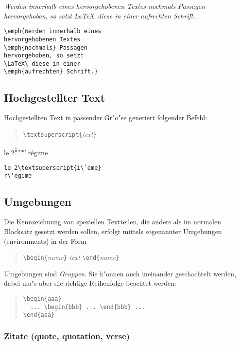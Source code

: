 \exa 
\emph{Werden innerhalb eines hervorgehobenen Textes
\emph{nochmals} Passagen hervorgehoben, so setzt \LaTeX\ diese in
einer \emph{aufrechten} Schrift.}
\exb
\begin{verbatim}
\emph{Werden innerhalb eines 
hervorgehobenen Textes 
\emph{nochmals} Passagen
hervorgehoben, so setzt
\LaTeX\ diese in einer 
\emph{aufrechten} Schrift.}
\end{verbatim}
\exc


\subsection{Hochgestellter Text}
Hochgestellten Text in passender Gr"o"se generiert folgender Befehl:
\begin{quote}
\verb|\textsuperscript{|\textit{text}\verb|}|
\end{quote}
\exa
le 2\textsuperscript{i\`eme} r\'egime
\exb
\begin{verbatim}
le 2\textsuperscript{i\`eme}
r\'egime
\end{verbatim}
\exc




\subsection{Umgebungen} \label{env}

Die Kennzeichnung von speziellen Textteilen, die anders als im
normalen Blocksatz gesetzt werden sollen, erfolgt mittels
sogenannter Umgebungen (environments) in der Form
\begin{quote}
\verb|\begin{|\textit{name}\verb|}|\quad
   \textit{text}\quad
   \verb|\end{|\textit{name}\verb|}|
\end{quote}
Umgebungen sind \emph{Gruppen}.
Sie k"onnen auch ineinander geschachtelt werden, dabei mu"s aber
die richtige Reihenfolge beachtet werden:
\begin{quote}
\verb|\begin{aaa}|\\
\verb|  ... \begin{bbb} ... \end{bbb} ... |\\
\verb|\end{aaa}|
\end{quote}


\subsubsection{Zitate (quote, quotation, verse)}
 

